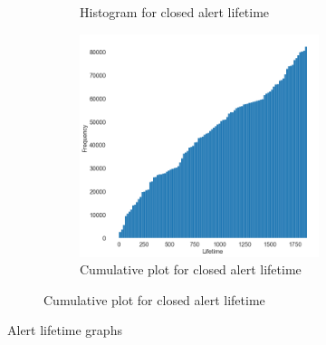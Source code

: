 \begin{figure}[h]
\begin{subfigure}{1\textwidth}
\begin{subfigure}{.5\textwidth}
			\caption{Histogram for closed alert lifetime}
		\end{subfigure}%
		\begin{subfigure}{.5\textwidth}
			\centering
			\includegraphics[scale=0.3]{./src/data_analysis/alert_lifetime_cumulative.png}
			\caption{Cumulative plot for closed alert lifetime}
		\end{subfigure}
	\end{subfigure}
	\caption{Alert lifetime graphs}
	\label{closed_alerts:lifetime}
\end{figure}


